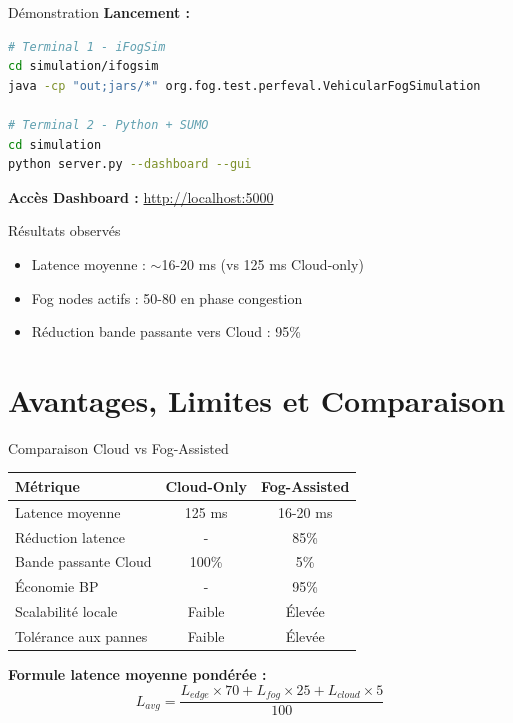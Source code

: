 ﻿\documentclass[aspectratio=169,11pt]{beamer}
\begin{document}
\begin{frame}[fragile]{D\'emonstration}
\textbf{Lancement :}

\begin{lstlisting}[language=bash]
# Terminal 1 - iFogSim
cd simulation/ifogsim
java -cp "out;jars/*" org.fog.test.perfeval.VehicularFogSimulation

# Terminal 2 - Python + SUMO
cd simulation
python server.py --dashboard --gui
\end{lstlisting}

\vspace{0.3cm}
\textbf{Acc\`es Dashboard :} \url{http://localhost:5000}

\begin{block}{R\'esultats observ\'es}
\begin{itemize}
    \item Latence moyenne : $\sim$16-20 ms (vs 125 ms Cloud-only)
    \item Fog nodes actifs : 50-80 en phase congestion
    \item R\'eduction bande passante vers Cloud : 95\%
\end{itemize}
\end{block}
\end{frame}

\section{Avantages, Limites et Comparaison}

\begin{frame}{Comparaison Cloud vs Fog-Assisted}
\begin{table}
\centering
\begin{tabular}{lcc}
\toprule
\textbf{M\'etrique} & \textbf{Cloud-Only} & \textbf{Fog-Assisted} \\
\midrule
Latence moyenne & 125 ms & 16-20 ms \\
R\'eduction latence & - & \textcolor{foggreen}{85\%} \\
Bande passante Cloud & 100\% & 5\% \\
\'Economie BP & - & \textcolor{foggreen}{95\%} \\
Scalabilit\'e locale & Faible & \'Elev\'ee \\
Tol\'erance aux pannes & Faible & \'Elev\'ee \\
\bottomrule
\end{tabular}
\end{table}

\vspace{0.3cm}
\textbf{Formule latence moyenne pond\'er\'ee :}
\begin{equation}
L_{avg} = \frac{L_{edge} \times 70 + L_{fog} \times 25 + L_{cloud} \times 5}{100}
\end{equation}
\end{frame}
\end{document}
